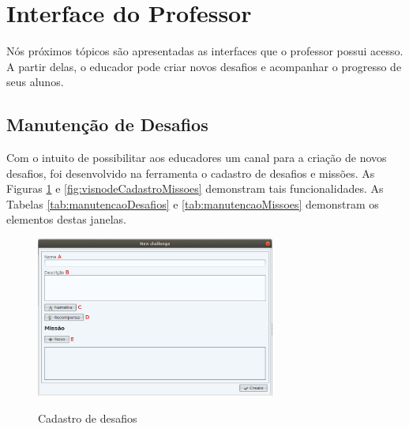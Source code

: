\documentclass[
	12pt,				%
	oneside,			%
	a4paper,			%
	english,			%
	french,				%
	spanish,			%
	brazil,				%
	]{abntex2}
\begin{document}
\section{Interface do Professor}

Nós próximos tópicos são apresentadas as interfaces que o professor possui acesso. A partir delas, o educador pode criar novos desafios e acompanhar o progresso de seus alunos.

\subsection{Manutenção de Desafios}

Com o intuito de possibilitar aos educadores um canal para a criação de novos desafios, foi desenvolvido na ferramenta o cadastro de desafios e missões. As Figuras \ref{fig:visnodeCadastroDesafio} e \ref{fig:visnodeCadastroMissoes} demonstram tais funcionalidades. As Tabelas \ref{tab:manutencaoDesafios} e \ref{tab:manutencaoMissoes} demonstram os elementos destas janelas.

\begin{figure}[H]
\centering
\caption{Cadastro de desafios}
\includegraphics[width=0.7\textwidth]{imagens/visnode_cadastro_desafio.png}
\sourceAuthor
\label{fig:visnodeCadastroDesafio}
\end{figure}
\end{document}
